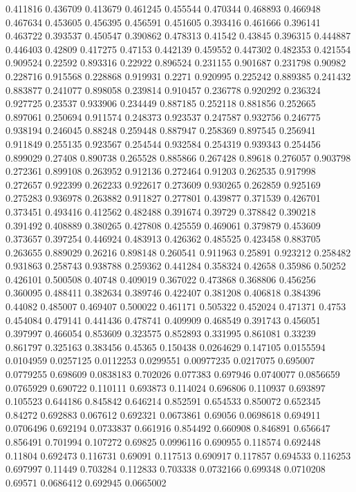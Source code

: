 0.411816 0.436709
0.413679 0.461245
0.455544 0.470344
0.468893 0.466948
0.467634 0.453605
0.456395 0.456591
0.451605 0.393416
0.461666 0.396141
0.463722 0.393537
0.450547 0.390862
0.478313 0.41542
0.43845 0.396315
0.444887 0.446403
0.42809 0.417275
0.47153 0.442139
0.459552 0.447302
0.482353 0.421554
0.909524 0.22592
0.893316 0.22922
0.896524 0.231155
0.901687 0.231798
0.90982 0.228716
0.915568 0.228868
0.919931 0.2271
0.920995 0.225242
0.889385 0.241432
0.883877 0.241077
0.898058 0.239814
0.910457 0.236778
0.920292 0.236324
0.927725 0.23537
0.933906 0.234449
0.887185 0.252118
0.881856 0.252665
0.897061 0.250694
0.911574 0.248373
0.923537 0.247587
0.932756 0.246775
0.938194 0.246045
0.88248 0.259448
0.887947 0.258369
0.897545 0.256941
0.911849 0.255135
0.923567 0.254544
0.932584 0.254319
0.939343 0.254456
0.899029 0.27408
0.890738 0.265528
0.885866 0.267428
0.89618 0.276057
0.903798 0.272361
0.899108 0.263952
0.912136 0.272464
0.91203 0.262535
0.917998 0.272657
0.922399 0.262233
0.922617 0.273609
0.930265 0.262859
0.925169 0.275283
0.936978 0.263882
0.911827 0.277801
0.439877 0.371539
0.426701 0.373451
0.493416 0.412562
0.482488 0.391674
0.39729 0.378842
0.390218 0.391492
0.408889 0.380265
0.427808 0.425559
0.469061 0.379879
0.453609 0.373657
0.397254 0.446924
0.483913 0.426362
0.485525 0.423458
0.883705 0.263655
0.889029 0.26216
0.898148 0.260541
0.911963 0.25891
0.923212 0.258482
0.931863 0.258743
0.938788 0.259362
0.441284 0.358324
0.42658 0.35986
0.50252 0.426101
0.500508 0.40748
0.409019 0.367022
0.473868 0.368806
0.456256 0.360095
0.488411 0.382634
0.389746 0.422407
0.381208 0.406818
0.384396 0.44082
0.485007 0.469407
0.500022 0.461171
0.505322 0.452024
0.471371 0.4753
0.454084 0.479141
0.441436 0.478741
0.409909 0.468549
0.391743 0.456051
0.397997 0.466054
0.853609 0.323575
0.852893 0.331995
0.861081 0.33239
0.861797 0.325163
0.383456 0.45365
0.150438 0.0264629
0.147105 0.0155594
0.0104959 0.0257125
0.0112253 0.0299551
0.00977235 0.0217075
0.695007 0.0779255
0.698609 0.0838183
0.702026 0.077383
0.697946 0.0740077
0.0856659 0.0765929
0.690722 0.110111
0.693873 0.114024
0.696806 0.110937
0.693897 0.105523
0.644186 0.845842
0.646214 0.852591
0.654533 0.850072
0.652345 0.84272
0.692883 0.067612
0.692321 0.0673861
0.69056 0.0698618
0.694911 0.0706496
0.692194 0.0733837
0.661916 0.854492
0.660908 0.846891
0.656647 0.856491
0.701994 0.107272
0.69825 0.0996116
0.690955 0.118574
0.692448 0.11804
0.692473 0.116731
0.69091 0.117513
0.690917 0.117857
0.694533 0.116253
0.697997 0.11449
0.703284 0.112833
0.703338 0.0732166
0.699348 0.0710208
0.69571 0.0686412
0.692945 0.0665002
